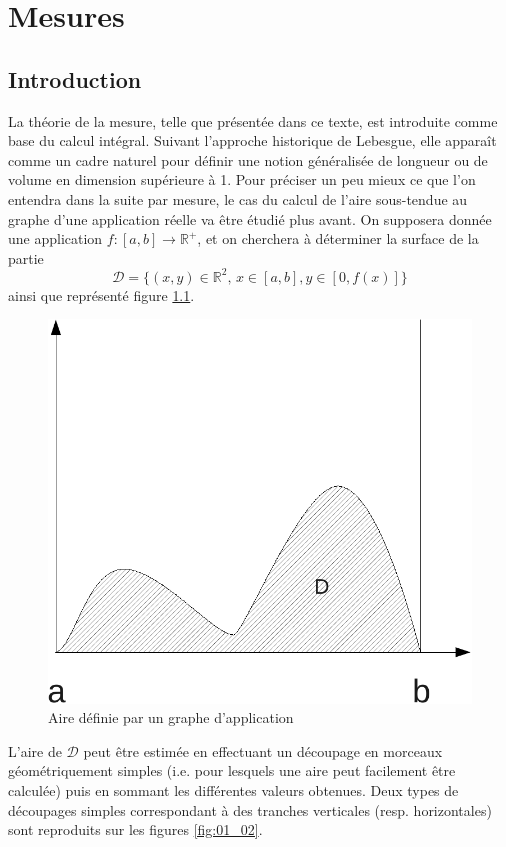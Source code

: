 \chapter{Mesures}
\section{Introduction}
La théorie de la mesure, telle que présentée dans ce texte, est introduite comme
base du calcul intégral. Suivant l'approche historique de Lebesgue, elle
apparaît comme un cadre naturel pour définir une notion généralisée de longueur
ou de volume en dimension supérieure à 1. Pour préciser un peu mieux ce que l'on
entendra dans la suite par mesure, le cas du calcul de l'aire sous-tendue au
graphe d'une application réelle va être étudié plus avant. On supposera donnée
une application $f \colon [a,b] \to \mathbb{R}^+$, et on cherchera à déterminer
la surface de la partie $$\mathcal{D} = \{ (x,y) \in \mathbb{R}^2, \, x \in
[a,b], y \in [0, f(x)] \}$$ ainsi que représenté figure \ref{fig:01_01}.
\begin{figure}
\includegraphics[scale=0.4]{images/surface_graphe.pdf}
\caption{Aire définie par un graphe d'application}\label{fig:01_01}
\end{figure}
L'aire de $\mathcal{D}$ peut être estimée en effectuant un découpage en
morceaux géométriquement simples (i.e. pour lesquels une aire peut facilement
être calculée) puis en sommant les différentes valeurs obtenues. Deux types de
découpages simples correspondant à des tranches verticales (resp. horizontales)
sont reproduits sur les figures \ref{fig:01_02}.


